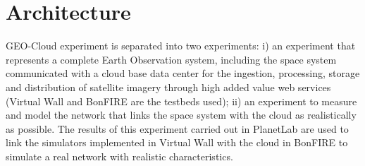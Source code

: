 \chapter{Architecture}

 GEO-Cloud experiment is separated into two experiments: i) an experiment that represents a complete Earth Observation system, including the space system communicated with a cloud base data center for the ingestion, processing, storage and distribution of satellite imagery through high added value web services (Virtual Wall and BonFIRE are the testbeds used); ii) an experiment to measure and model the network that links the space system with the cloud as realistically as possible. The results of this experiment carried out in PlanetLab are used to link the simulators implemented in Virtual Wall with the cloud in BonFIRE to simulate a real network with realistic characteristics.




